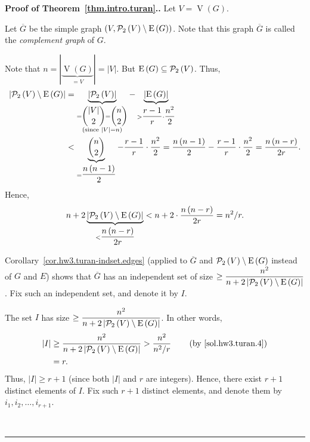 \documentclass[numbers=enddot,12pt,final,onecolumn,notitlepage]{scrartcl}%
\theoremstyle{definition}
\newenvironment{proof}[1][Proof]{\noindent\textbf{#1.} }{\ \rule{0.5em}{0.5em}}
\newcommand{\powset}[2][]{\ifthenelse{\equal{#2}{}}{\mathcal{P}\left(#1\right)}{\mathcal{P}_{#1}\left(#2\right)}}
\newcommand{\abs}[1]{\left| #1 \right|}
\newcommand{\tup}[1]{\left( #1 \right)}
\newcommand{\verts}[1]{\operatorname{V}\left( #1 \right)}
\newcommand{\edges}[1]{\operatorname{E}\left( #1 \right)}
\newcommand{\underbrack}[2]{\underbrace{#1}_{\substack{#2}}}
\begin{document}
\begin{proof}[Proof of Theorem~\ref{thm.intro.turan}.]
Let $V = \verts{G}$.

Let $\overline{G}$ be the simple graph
$\tup{V, \powset[2]{V} \setminus \edges{G}}$.
Note that this graph $\overline{G}$ is called the \textit{complement
graph} of $G$.

Note that $n = \abs{\underbrace{\verts{G}}_{= V}} = \abs{V}$.
But $\edges{G} \subseteq \powset[2]{V}$. Thus,
\begin{align*}
\abs{\powset[2]{V} \setminus \edges{G}}
&= \underbrack{\abs{\powset[2]{V}}}
             {= \dbinom{\abs{V}}{2} = \dbinom{n}{2} \\
                \text{(since } \abs{V} = n \text{)}}
  - \underbrack{\abs{\edges{G}}}
               {> \dfrac{r-1}{r} \cdot \dfrac{n^2}{2}} \\
&< \underbrace{\dbinom{n}{2}}_{= \dfrac{n\tup{n-1}}{2}}
  - \dfrac{r-1}{r} \cdot \dfrac{n^2}{2}
= \dfrac{n\tup{n-1}}{2} - \dfrac{r-1}{r} \cdot \dfrac{n^2}{2}
= \dfrac{n \tup{n-r}}{2r} .
\end{align*}
Hence,
\begin{equation}
n + 2 \underbrack{\abs{\powset[2]{V} \setminus \edges{G}}}
                 {< \dfrac{n \tup{n-r}}{2r}}
< n + 2 \cdot \dfrac{n \tup{n-r}}{2r} = n^2 / r .
\label{sol.hw3.turan.4}
\end{equation}

Corollary~\ref{cor.hw3.turan-indset.edges} (applied to $\overline{G}$
and $\powset[2]{V} \setminus \edges{G}$ instead of $G$ and $E$) shows
that
$\overline{G}$ has an independent set of size
$\geq \dfrac{n^2}{n+2\abs{\powset[2]{V} \setminus \edges{G}}}$.
Fix such an independent set, and denote it by $I$.

The set $I$ has size
$\geq \dfrac{n^2}{n+2\abs{\powset[2]{V} \setminus \edges{G}}}$.
In other words,
\begin{align*}
\abs{I}
&\geq \dfrac{n^2}{n+2\abs{\powset[2]{V} \setminus \edges{G}}}
> \dfrac{n^2}{n^2 / r}
    \qquad \left(\text{by \eqref{sol.hw3.turan.4}}\right) \\
&= r .
\end{align*}
Thus, $\abs{I} \geq r+1$ (since both $\abs{I}$ and $r$ are integers).
Hence, there exist $r + 1$ distinct elements of $I$.
Fix such $r + 1$ distinct elements, and denote them by
$i_1, i_2, \ldots, i_{r+1}$.


\end{proof}
\end{document}
